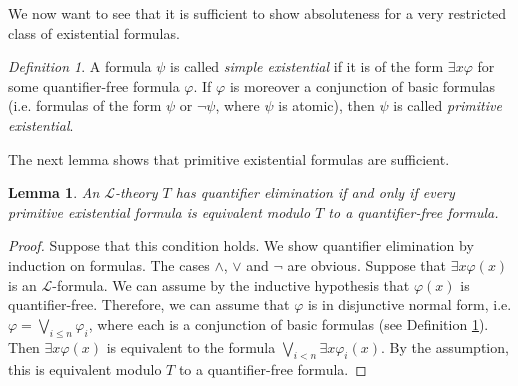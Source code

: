\documentclass[a4paper, 11pt]{amsart}
\newtheorem{lemma}[lemma]{Lemma}
\theoremstyle{remark}
\newtheorem{definition}[definition]{Definition}
\newcommand{\cA}{\mathcal A}
\newcommand{\cL}{\mathcal L}
\newcommand{\cN}{\mathcal N}
\begin{document}
We now want to see that it is sufficient to show absoluteness for a very restricted class of existential formulas. 

\begin{definition} 
\label{definition simple existential formula} 
A formula $\psi$ is called \emph{simple existential} if it is of the form $\exists x \varphi$ for some quantifier-free formula $\varphi$. If $\varphi$ is moreover a conjunction of basic formulas (i.e. formulas of the form $\psi$ or $\neg\psi$, where $\psi$ is atomic), then $\psi$ is called \emph{primitive existential}. 
\end{definition} 

The next lemma shows that primitive existential formulas are sufficient.  

\begin{lemma} \label{quantifier elimination using primitive existential formulas}
An $\cL$-theory $T$ has quantifier elimination if and only if every primitive existential formula is equivalent modulo $T$ to a quantifier-free formula. 
\end{lemma} 
\begin{proof} 
Suppose that this condition holds. 
We show quantifier elimination by induction on formulas. 
The cases $\wedge$, $\vee$ and $\neg$ are obvious. 
Suppose that $\exists x \varphi(x)$ is an $\cL$-formula. 
We can assume by the inductive hypothesis that $\varphi(x)$ is quantifier-free. 
Therefore, we can assume that $\varphi$ is in disjunctive normal form, i.e. $\varphi= \bigvee_{i\leq n} \varphi_i$, where each is a conjunction of basic formulas (see Definition \ref{definition simple existential formula}). 
Then $\exists x \varphi(x)$ is equivalent to the formula $\bigvee_{i<n}\exists x \varphi_i(x)$. By the assumption, this is equivalent modulo $T$ to a quantifier-free formula.  
\end{proof} 

\end{document}
